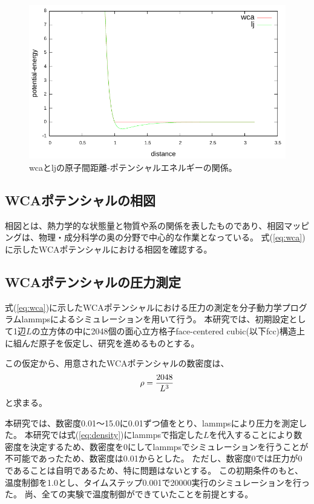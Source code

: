 \documentclass[titlepage]{jsreport}
\begin{document}
\begin{figure}[htbp]
    \begin{center}
        \includegraphics[width=15cm]{fig/dis-poen.pdf}
    \end{center}
    \caption{wcaとljの原子間距離-ポテンシャルエネルギーの関係。}
    \label{fig:dis-poen}
\end{figure}

\subsection{WCAポテンシャルの相図}\label{method-subsec:WCA-phase}
相図とは、熱力学的な状態量と物質や系の関係を表したものであり、相図マッピングは、物理・成分科学の奥の分野で中心的な作業となっている。\cite{phase-diagram}
式(\ref{eq:wca})に示したWCAポテンシャルにおける相図を確認する。


\subsection{WCAポテンシャルの圧力測定}\label{method-subsec:WCA-pressure}
式(\ref{eq:wca})に示したWCAポテンシャルにおける圧力の測定を分子動力学プログラムlammps\cite{lammps}によるシミュレーションを用いて行う。
本研究では、初期設定として1辺$L$の立方体の中に2048個の面心立方格子face-centered cubic(以下fcc)構造上に組んだ原子を仮定し、研究を進めるものとする。

この仮定から、用意されたWCAポテンシャルの数密度は、
\large
\begin{equation}
\rho = {\frac{2048}{L^3}}{\label{eq:density}}
\end{equation}
\normalsize
と求まる。

本研究では、数密度0.01〜15.0に0.01ずつ値をとり、lammpsにより圧力を測定した。
本研究では式(\ref{eq:density})にlammpsで指定した$L$を代入することにより数密度を決定するため、数密度を0にしてlammpsでシミュレーションを行うことが不可能であったため、数密度は0.01からとした。
ただし、数密度0では圧力が0であることは自明であるため、特に問題はないとする。
この初期条件のもと、温度制御を1.0とし、タイムステップ0.001で20000実行のシミュレーションを行った。
尚、全ての実験で温度制御ができていたことを前提とする。
\end{document}
